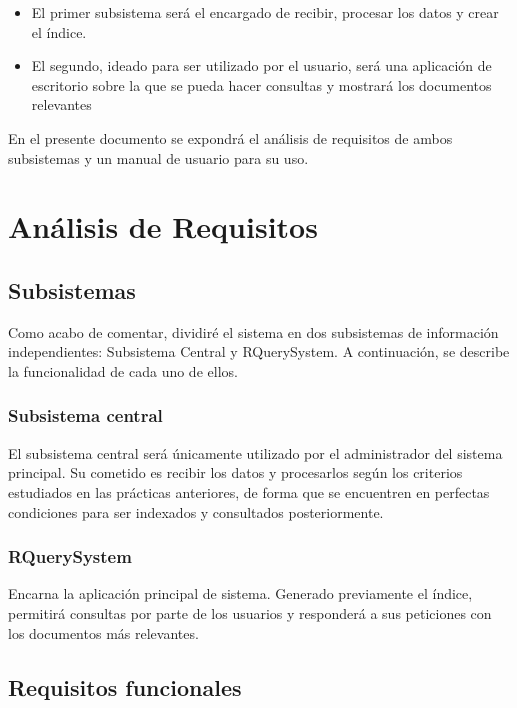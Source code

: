 \begin{itemize}
	\item El primer subsistema será el encargado de recibir, procesar los datos y crear el índice.
	\item El segundo, ideado para ser utilizado por el usuario, será una aplicación de escritorio sobre la que se pueda hacer consultas y mostrará los documentos relevantes
\end{itemize}


En el presente documento se expondrá el análisis de requisitos de ambos subsistemas y un manual de usuario para su uso. 

\section{Análisis de Requisitos}

\subsection{Subsistemas}

Como acabo de comentar, dividiré el sistema en dos subsistemas de información independientes: Subsistema Central y RQuerySystem. A continuación, se describe la funcionalidad de cada uno de ellos.

\subsubsection{Subsistema central}

El subsistema central será únicamente utilizado por el administrador del sistema principal. Su cometido es recibir los datos y procesarlos según los criterios estudiados en las prácticas anteriores, de forma que se encuentren en perfectas condiciones para ser indexados y consultados posteriormente. 

\subsubsection{RQuerySystem}

Encarna la aplicación principal de sistema. Generado previamente el índice, permitirá consultas por parte de los usuarios y responderá a sus peticiones con los documentos más relevantes.

\subsection{Requisitos funcionales}

